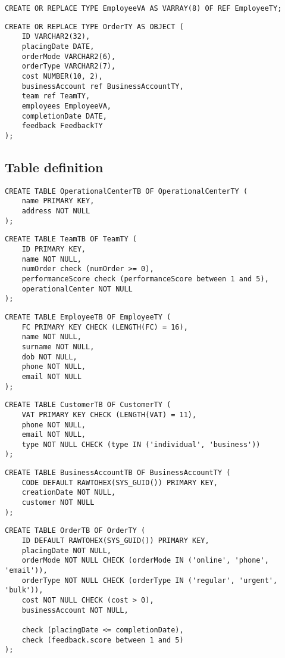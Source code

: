 \begin{lstlisting}
CREATE OR REPLACE TYPE EmployeeVA AS VARRAY(8) OF REF EmployeeTY;
\end{lstlisting}

\begin{lstlisting}    
CREATE OR REPLACE TYPE OrderTY AS OBJECT (
    ID VARCHAR2(32),
    placingDate DATE,
    orderMode VARCHAR2(6),
    orderType VARCHAR2(7),
    cost NUMBER(10, 2),
    businessAccount ref BusinessAccountTY,
    team ref TeamTY,
    employees EmployeeVA,
    completionDate DATE,
    feedback FeedbackTY
);
\end{lstlisting}

\subsection*{Table definition}
\begin{lstlisting}
CREATE TABLE OperationalCenterTB OF OperationalCenterTY (
    name PRIMARY KEY,
    address NOT NULL
); 
\end{lstlisting}

\begin{lstlisting}
CREATE TABLE TeamTB OF TeamTY (
    ID PRIMARY KEY,
    name NOT NULL,
    numOrder check (numOrder >= 0),
    performanceScore check (performanceScore between 1 and 5),
    operationalCenter NOT NULL
);
\end{lstlisting}

\begin{lstlisting}
CREATE TABLE EmployeeTB OF EmployeeTY (
    FC PRIMARY KEY CHECK (LENGTH(FC) = 16),
    name NOT NULL,
    surname NOT NULL,
    dob NOT NULL,
    phone NOT NULL,
    email NOT NULL
);
\end{lstlisting}

\begin{lstlisting}
CREATE TABLE CustomerTB OF CustomerTY (
    VAT PRIMARY KEY CHECK (LENGTH(VAT) = 11),
    phone NOT NULL,
    email NOT NULL,
    type NOT NULL CHECK (type IN ('individual', 'business'))
);
\end{lstlisting}

\begin{lstlisting}
CREATE TABLE BusinessAccountTB OF BusinessAccountTY (
    CODE DEFAULT RAWTOHEX(SYS_GUID()) PRIMARY KEY,
    creationDate NOT NULL,
    customer NOT NULL
);
\end{lstlisting}

\begin{lstlisting}
CREATE TABLE OrderTB OF OrderTY (
    ID DEFAULT RAWTOHEX(SYS_GUID()) PRIMARY KEY,
    placingDate NOT NULL,
    orderMode NOT NULL CHECK (orderMode IN ('online', 'phone', 'email')),
    orderType NOT NULL CHECK (orderType IN ('regular', 'urgent', 'bulk')),
    cost NOT NULL CHECK (cost > 0),
    businessAccount NOT NULL,

    check (placingDate <= completionDate),
    check (feedback.score between 1 and 5)
);
\end{lstlisting}
